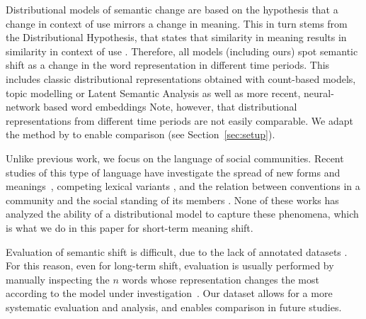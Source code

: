 Distributional models of semantic change are based on the hypothesis
that a change in context of use mirrors a change in meaning.
This in turn stems from the Distributional Hypothesis, that states
that similarity in meaning results in similarity in context of use \cite{harris1954distributional}.
Therefore, all models (including ours) spot semantic shift as a change in the word representation in different time periods.
This includes classic distributional representations obtained with count-based models, topic
modelling or Latent Semantic Analysis
\cite{sagi2011tracing,jatowt2014framework,wijaya2011understanding,gulordava2011distributional}
as well as more recent, neural-network based word embeddings
\cite{kim2014temporal,kulkarni2015statistically,hamilton2016diachronic,azarbonyad2017words,szymanski2017temporal,yao2018dynamic} %
Note, however, that distributional representations from different time periods 
are not easily comparable.
We adapt the method by  to enable comparison
(see Section~\ref{sec:setup}).

Unlike previous work, we focus on the language of social communities.
Recent studies of this type of language have investigate the spread of new forms and meanings~\cite{del2017semantic,del2018road,stewart2018making}, 
competing lexical variants \cite{rotabi2017competition}, and the relation between conventions in a community and 
the social standing of its members \cite{danescu2013no}. 
None of these works has analyzed the ability of a distributional model to capture these phenomena, 
which is what we do in this paper for short-term meaning shift. 

Evaluation of semantic shift is difficult, due to the lack of
annotated datasets \cite{frermann2016bayesian}. For this reason, even for long-term shift, evaluation is usually performed by manually
inspecting the $n$ words whose representation changes the most
according to the model under investigation~\cite{hamilton2016diachronic,kim2014temporal}.
Our dataset allows for a more systematic evaluation and analysis, and
enables comparison in future studies.

